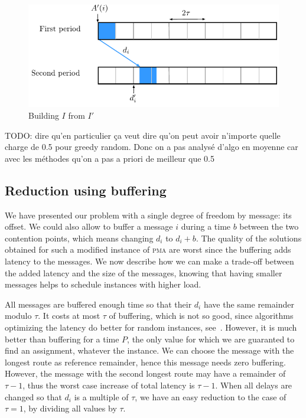 \documentclass[a4paper,UKenglish,cleveref, autoref, thm-restate]{lipics-v2019}
\newcommand\pma{\textsc{pma}\xspace}
\newcommand{\todo}[1]{{\color{red} TODO: {#1}}}
\begin{document}
\begin{figure}[h]
\begin{center}

\includegraphics[scale=0.7]{transfo2tau}
\end{center}
\caption{Building $I$ from $I'$}
\label{fig:transf_2tau}
\end{figure}


\todo{dire qu'en particulier ça veut dire qu'on peut avoir n'importe quelle charge de 0.5 pour greedy random.
Donc on a pas analysé d'algo en moyenne car avec les méthodes qu'on a pas a priori de meilleur que 0.5}



\subsection{Reduction using buffering}

We have presented our problem with a single degree of freedom by message: its
offset. We could also allow to buffer a message $i$ during a time $b$ between the two contention points, which means changing $d_i$ to $d_i + b$. The quality of the solutions obtained for such a modified instance of \pma are worst since the buffering adds latency to the messages. We now describe how we can make a trade-off between the added latency and the size of the messages, knowing that having smaller messages helps to schedule instances with higher load.


All messages are buffered enough time so that their $d_i$ have the same
remainder modulo $\tau$. It costs at most $\tau$ of buffering, which is not
so good, since algorithms optimizing the latency do better for random instances, see~\cite{barth2018deterministic}. However, it is much better than buffering for a time $P$, the only value for which we are guaranted to find an assignment, whatever the instance. We can choose the message with the longest route as reference remainder, hence this message needs zero buffering. However, the message with the second longest route may have a remainder of $\tau -1$, thus the worst case increase of total latency is $\tau -1$. When all delays are changed so that $d_i$ is a multiple of $\tau$, we have an easy reduction to the case of $\tau = 1$, by dividing all values by $\tau$.
\end{document}
